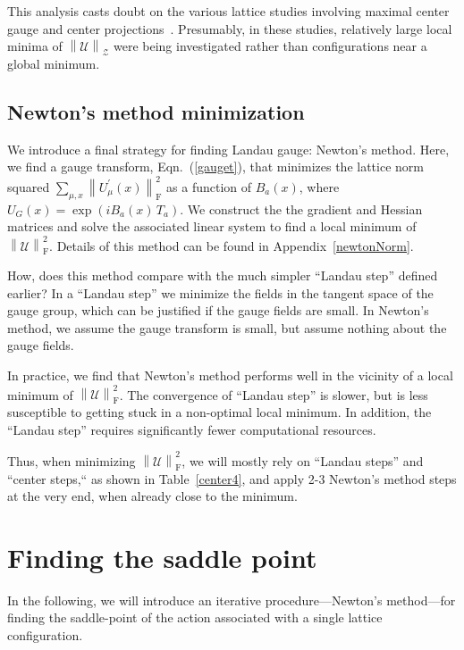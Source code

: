 \documentclass[preprint,aps,prd]{revtex4-2}
\newcommand{\zentrum}{\mathcal{Z}}       %
\newcommand{\config}{\mathcal{U}}
\newcommand\fnorm[1]{\left\lVert #1 \right\rVert_\mathrm{F}}
\newcommand\znorm[1]{\left\lVert #1 \right\rVert_\zentrum}
\begin{document}
This analysis casts doubt on the various lattice studies involving
maximal center gauge and center projections~\cite{
del_debbio_center_1997,del_debbio_detection_1998,de_forcrand_relevance_1999}.
Presumably, in these studies, relatively large local minima of
$\znorm{\config}$ were being investigated
rather than configurations near a global minimum.


\subsection{Newton's method minimization}

We introduce a final strategy for finding Landau gauge:
Newton's method.  Here, we find a gauge transform, Eqn.~(\ref{gauget}),
that minimizes the lattice norm squared $\sum_{\mu,x}\fnorm{U_\mu^\prime(x)}^2$
as a function of $B_a(x)$,
where $U_G(x) = \exp\left(i B_a(x)\, T_a\right)$.
We construct the the gradient and Hessian matrices
and solve the associated linear system to find a local minimum of
$\fnorm{\config}^2$.
Details of this method can be found in Appendix~\ref{newtonNorm}.

How, does this method compare with the much simpler ``Landau step'' defined
earlier?  In a ``Landau step'' we minimize the fields in the tangent space
of the gauge group, which can be justified if the gauge fields are small.
In Newton's method, we assume the gauge transform is small, but
assume nothing about the gauge fields.

In practice, we find that Newton's method performs well in the
vicinity of a local minimum of $\fnorm{\config}^2$.
The convergence of ``Landau step'' is slower, but is less susceptible
to getting stuck in a non-optimal local minimum.  In addition,
the ``Landau step'' requires significantly fewer computational resources.

Thus, when minimizing $\fnorm{\config}^2$, we will mostly rely
on ``Landau steps'' and ``center steps,`` as shown in Table~\ref{center4},
and apply 2-3 Newton's method steps at the very end,
when already close to the minimum.

\section{Finding the saddle point}
\label{saddlePoint}

In the following, we will introduce an iterative
procedure---Newton's method---for finding the saddle-point
of the action associated with a single lattice configuration.
\end{document}
